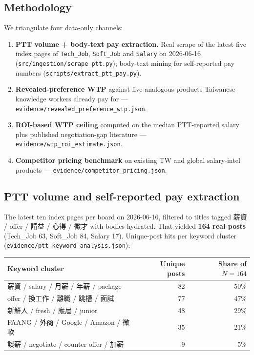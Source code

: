 \documentclass[11pt,a4paper]{article}
\begin{document}
\subsection{Methodology}
We triangulate four data-only channels:
\begin{enumerate}[leftmargin=*,itemsep=0.1em,topsep=0.2em]
  \item \textbf{PTT volume + body-text pay extraction.} Real scrape of
    the latest five index pages of \texttt{Tech\_Job},
    \texttt{Soft\_Job} and \texttt{Salary} on 2026-06-16
    (\texttt{src/ingestion/scrape\_ptt.py}); body-text mining for
    self-reported pay numbers (\texttt{scripts/extract\_ptt\_pay.py}).
  \item \textbf{Revealed-preference WTP} against five analogous products
    Taiwanese knowledge workers already pay for ---
    \texttt{evidence/revealed\_preference\_wtp.json}.
  \item \textbf{ROI-based WTP ceiling} computed on the median PTT-reported
    salary plus published negotiation-gap literature ---
    \texttt{evidence/wtp\_roi\_estimate.json}.
  \item \textbf{Competitor pricing benchmark} on existing TW and global
    salary-intel products --- \texttt{evidence/competitor\_pricing.json}.
\end{enumerate}

\subsection{PTT volume and self-reported pay extraction}

The latest ten index pages per board on 2026-06-16, filtered to titles
tagged 薪資 / offer / 請益 / 心得 / 徵才 with bodies hydrated. That
yielded \textbf{164 real posts} (Tech\_Job 63, Soft\_Job 84, Salary
17). Unique-post hits per keyword cluster
(\texttt{evidence/ptt\_keyword\_analysis.json}):

\begin{center}\small
\begin{tabular}{lrr}
\toprule
\textbf{Keyword cluster} & \textbf{Unique posts} & \textbf{Share of $N=164$} \\
\midrule
薪資 / salary / 月薪 / 年薪 / package    & 82 & 50\% \\
offer / 換工作 / 離職 / 跳槽 / 面試      & 77 & 47\% \\
新鮮人 / fresh / 應屆 / junior            & 48 & 29\% \\
FAANG / 外商 / Google / Amazon / 微軟    & 35 & 21\% \\
談薪 / negotiate / counter offer / 加薪  &  9 &  5\% \\
\bottomrule
\end{tabular}
\end{center}
\end{document}
